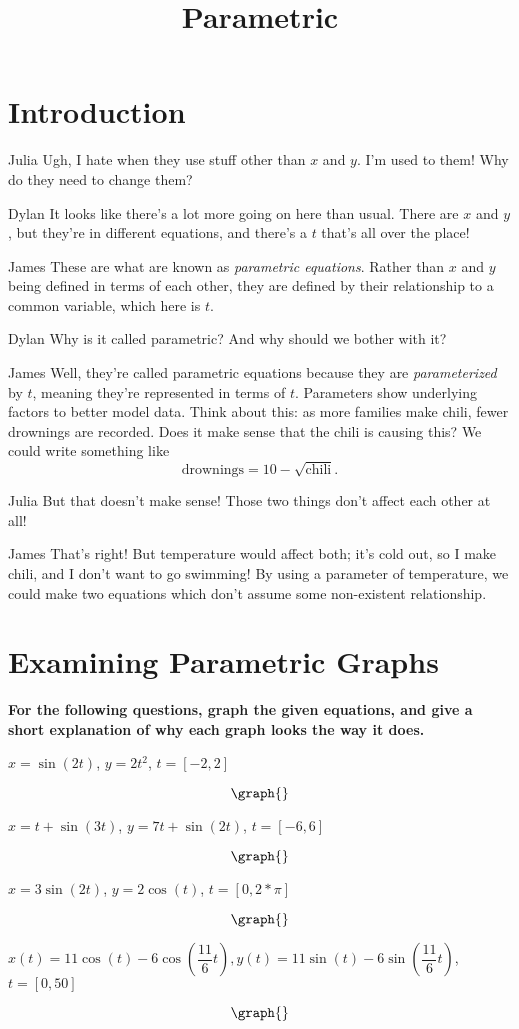 \documentclass{ximera}
\title{Parametric}
\begin{document}
\maketitle
\section{Introduction}
\begin{dialogue}
\item[Julia] Ugh, I hate when they use stuff other than $x$ and $y$. I'm used to them! Why do they need to change them?
\item[Dylan] It looks like there's a lot more going on here than usual. There are $x$ and $y$, but they're in different equations, and there's a $t$ that's all over the place!
\item[James] These are what are known as \textit{parametric equations}. Rather than $x$ and $y$ being defined in terms of each other, they are defined by their relationship to a common variable, which here is $t$.
\item[Dylan] Why is it called parametric? And why should we bother with it?
\item[James] Well, they're called parametric equations because they are \textit{parameterized} by $t$, meaning they're represented in terms of $t$. Parameters show underlying factors to better model data. Think about this: as more families make chili, fewer drownings are recorded. Does it make sense that the chili is causing this? We could write something like $$\text{drownings} = 10 - \sqrt{\text{chili}}\text{.}$$
\item[Julia] But that doesn't make sense! Those two things don't affect each other at all!
\item[James] That's right! But temperature would affect both; it's cold out, so I make chili, and I don't want to go swimming! By using a parameter of temperature, we could make two equations which don't assume some non-existent relationship.
\end{dialogue}

\section{Examining Parametric Graphs}
\textbf{For the following questions, graph the given equations, and give a short explanation of why each graph looks the way it does.}
\begin{question}
$x = \sin(2t)$, $y = 2t^2$, $t = [-2,2]$

\[
\graph{}
\]


$x = t + \sin(3t)$, $y = 7t + \sin(2t)$, $t = [-6,6]$

\[
\graph{}
\]

$x = 3\sin(2t)$, $y = 2\cos(t)$, $t = [0,2*\pi]$

\[
\graph{}
\]

$x(t) = 11\cos(t) - 6\cos(\dfrac{11}{6}t), y(t) = 11\sin(t) - 6\sin(\dfrac{11}{6} t)$, $t = [0,50]$

\[
\graph{}
\]

\end{question}
\end{document}

